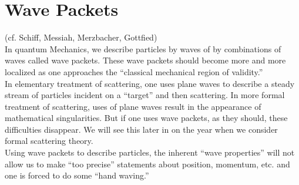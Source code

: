 \section{Wave Packets}
(cf. Schiff, Messiah, Merzbacher, Gottfied)\\
In quantum Mechanics, we describe particles by waves of by combinations of waves called wave packets. These wave packets should become more and more localized as one approaches the ``classical mechanical region of validity.''\\
In elementary treatment of scattering, one uses plane waves to describe a steady stream of particles incident on a ``target'' and then scattering. In more formal treatment of scattering, uses of plane waves result in the appearance of 
mathematical singularities. But if one uses wave packets, as they should, these difficulties disappear. We will see this later in on the year when we consider formal scattering theory.\\
Using wave packets to describe particles, the inherent ``wave properties'' will not allow us to make ``too precise'' statements about position, momentum, etc. and one is forced to do some ``hand waving.''
